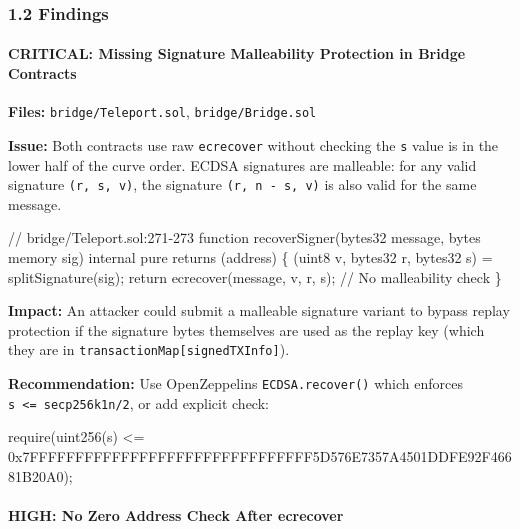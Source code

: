 \documentclass[
]{article}
\newenvironment{Shaded}{}{}
\newcommand{\NormalTok}[1]{#1}
\begin{document}
\subsubsection{1.2 Findings}\label{12-findings}

\paragraph{CRITICAL: Missing Signature Malleability Protection in Bridge
Contracts}\label{critical-missing-signature-malleability-protection-in-bridge-contracts}

\textbf{Files:} \texttt{bridge/Teleport.sol}, \texttt{bridge/Bridge.sol}

\textbf{Issue:} Both contracts use raw \texttt{ecrecover} without
checking the \texttt{s} value is in the lower half of the curve order.
ECDSA signatures are malleable: for any valid signature
\texttt{(r,\ s,\ v)}, the signature
\texttt{(r,\ n\ -\ s,\ v\textquotesingle{})} is also valid for the same
message.

\begin{Shaded}
\begin{Highlighting}[]
\NormalTok{// bridge/Teleport.sol:271{-}273}
\NormalTok{function recoverSigner(bytes32 message, bytes memory sig) internal pure returns (address) \{}
\NormalTok{    (uint8 v, bytes32 r, bytes32 s) = splitSignature(sig);}
\NormalTok{    return ecrecover(message, v, r, s);  // No malleability check}
\NormalTok{\}}
\end{Highlighting}
\end{Shaded}

\textbf{Impact:} An attacker could submit a malleable signature variant
to bypass replay protection if the signature bytes themselves are used
as the replay key (which they are in
\texttt{transactionMap{[}signedTXInfo{]}}).

\textbf{Recommendation:} Use OpenZeppelin\textquotesingle s
\texttt{ECDSA.recover()} which enforces
\texttt{s\ \textless{}=\ secp256k1n/2}, or add explicit check:

\begin{Shaded}
\begin{Highlighting}[]
\NormalTok{require(uint256(s) \textless{}= 0x7FFFFFFFFFFFFFFFFFFFFFFFFFFFFFFF5D576E7357A4501DDFE92F46681B20A0);}
\end{Highlighting}
\end{Shaded}

\paragraph{HIGH: No Zero Address Check After
ecrecover}\label{high-no-zero-address-check-after-ecrecover}
\end{document}
